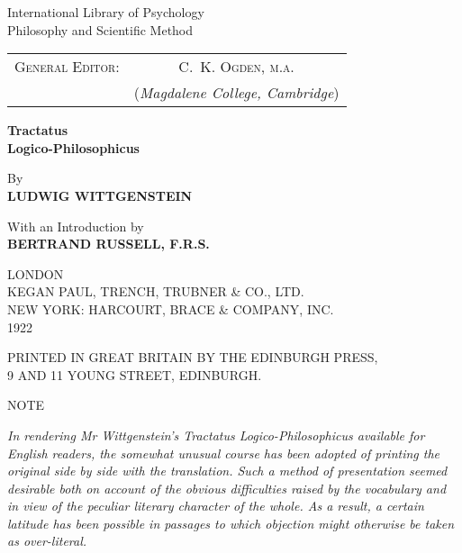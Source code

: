 \documentclass[12pt,oneside]{book}[2007/10/19]
\newcommand{\Note}{\newpage\null\vfill
  \begin{center}
  {\large NOTE}
  \end{center}
}
\newcommand{\BookTitle}[1]{\emph{#1}}
\begin{document}
\mainmatter
\begin{center}
{\LARGE International Library of Psychology\\
\vspace{0.5ex}
Philosophy and Scientific Method}

\vspace{\baselineskip}
\begin{tabular}{lc}
\textsc{General Editor:} & \hspace{2em}\textsc{C.~K. Ogden, m.a.}\\
& \hspace{2em}(\textit{Magdalene College, Cambridge})\\
\end{tabular}


\cleardoublepage
{\Huge\bfseries Tractatus\\
\vspace{1.2ex}
Logico-Philosophicus}

\vspace{15ex}

By\\
\vspace{0.7ex}
\textbf{LUDWIG WITTGENSTEIN}

\vspace{2\baselineskip}

With an Introduction by\\
\vspace{0.7ex}
\textbf{BERTRAND RUSSELL, F.R.S.}

\vfill

LONDON\\
\vspace{0.5ex}
{\large KEGAN PAUL, TRENCH, TRUBNER \& CO., LTD.\\}
\vspace{0.5ex}
NEW YORK: HARCOURT, BRACE \& COMPANY, INC.\\
\vspace{1ex}
1922

\newpage\null\vfill
{\footnotesize PRINTED IN GREAT BRITAIN BY THE EDINBURGH PRESS,\\
9 AND 11 YOUNG STREET, EDINBURGH.}
\end{center}




\Note

\textit{In rendering Mr Wittgenstein's \BookTitle{Tractatus Logico-Philosophicus}
available for English readers, the somewhat unusual course has been
adopted of printing the original side by side with the translation.
Such a method of presentation seemed desirable both on account of the
obvious difficulties raised by the vocabulary and in view of the
peculiar literary character of the whole. As a result, a certain
latitude has been possible in passages to which objection might
otherwise be taken as over-literal.}
\end{document}
